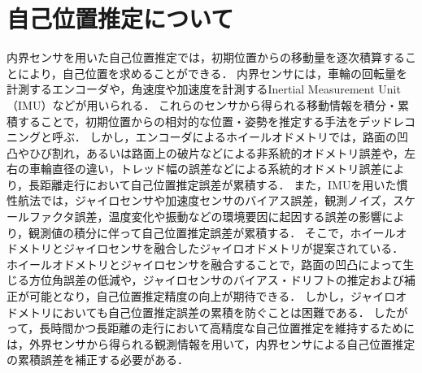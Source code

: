 \section{自己位置推定について}
内界センサを用いた自己位置推定では，初期位置からの移動量を逐次積算することにより，自己位置を求めることができる．
内界センサには，車輪の回転量を計測するエンコーダや，角速度や加速度を計測するInertial Measurement Unit（IMU）などが用いられる．
これらのセンサから得られる移動情報を積分・累積することで，初期位置からの相対的な位置・姿勢を推定する手法をデッドレコニングと呼ぶ．
しかし，エンコーダによるホイールオドメトリでは，路面の凹凸やひび割れ，あるいは路面上の破片などによる非系統的オドメトリ誤差や，左右の車輪直径の違い，トレッド幅の誤差などによる系統的オドメトリ誤差により，長距離走行において自己位置推定誤差が累積する\cite{borenstein1996measurement}．
また，IMUを用いた慣性航法では，ジャイロセンサや加速度センサのバイアス誤差，観測ノイズ，スケールファクタ誤差，温度変化や振動などの環境要因に起因する誤差の影響により，観測値の積分に伴って自己位置推定誤差が累積する\cite{borodacz2022review}．
そこで，ホイールオドメトリとジャイロセンサを融合したジャイロオドメトリが提案されている\cite{borenstein1996gyrodometry,前山祥一1997移動ロボットの屋外ナビゲーションのためのオドメトリとジャイロのセンサ融合によるデッドレコニング}．
ホイールオドメトリとジャイロセンサを融合することで，路面の凹凸によって生じる方位角誤差の低減や，ジャイロセンサのバイアス・ドリフトの推定および補正が可能となり，自己位置推定精度の向上が期待できる．
しかし，ジャイロオドメトリにおいても自己位置推定誤差の累積を防ぐことは困難である．
したがって，長時間かつ長距離の走行において高精度な自己位置推定を維持するためには，外界センサから得られる観測情報を用いて，内界センサによる自己位置推定の累積誤差を補正する必要がある．


